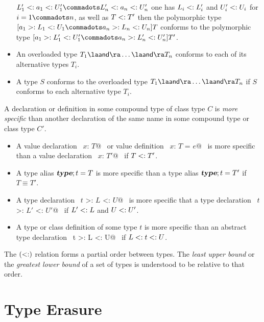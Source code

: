 \documentclass[a4paper,12pt,twoside,titlepage]{book}
\newcommand{\overload}{\la\mbox{\sf and}\ra}
\begin{document}
\begin{itemize}
$L'_1 \conforms a_1 \conforms U'_1 \commadots L'_n \conforms a_n \conforms U'_n$ 
one has $L_i <: L'_i$ and $U'_i <: U_i$
for $i = 1 \commadots n$, as well as $T <: T'$ then the polymorphic type
$[a_1 >: L_1 <: U_1 \commadots a_n >: L_n <: U_n] T$ conforms to the polymorphic type
$[a_1 >: L'_1 <: U'_1 \commadots a_n >: L'_n <: U'_n] T'$.
\item 
An overloaded type $T_1 \overload \ldots \overload T_n$ conforms to each of its alternative types $T_i$.
\item
A type $S$ conforms to the overloaded type $T_1 \overload \ldots \overload T_n$
if $S$ conforms to each alternative type $T_i$.
\end{itemize}

A declaration or definition in some compound type of class type $C$
is {\em more specific} than another
declaration of the same name in some compound type or class type $C'$.
\begin{itemize}
\item
A value declaration ~\lstinline@val $x$: $T$@~ or value definition
~\lstinline@val $x$: $T$ = $e$@~ is more specific than a value declaration
~\lstinline@val $x$: $T'$@~ if $T <: T'$.
\item
A type alias
$\mbox{\sl\bfseries type};t=T$ is more specific than a type alias $\mbox{\sl\bfseries type};t=T'$ if
$T \equiv T'$.
\item 
A type declaration ~\lstinline@type $t$ >: $L$ <: $U$@~ is more specific that 
a type declaration ~\lstinline@type $t$ >: $L'$ <: $U'$@~ if $L' <: L$ and 
$U <: U'$.
\item
A type or class definition of some type $t$ is more specific than an abstract
type declaration ~\lstinline@type t >: L <: U@~ if
$L <: t <: U$.
\end{itemize}

The $(<:)$ relation forms a partial order between types. The {\em
least upper bound} or the {\em greatest lower bound} of a set of types
is understood to be relative to that order.

\section{Type Erasure}
\label{sec:erasure}
\end{document}
